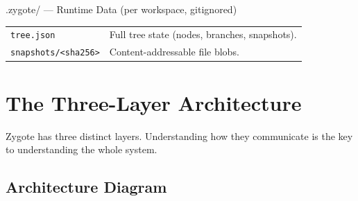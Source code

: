 \documentclass[12pt, a4paper]{article}
\begin{document}
\begin{filebox}{.zygote/ --- Runtime Data (per workspace, gitignored)}
\begin{tabular}{@{}p{6.5cm}p{7.5cm}@{}}
\texttt{tree.json} & Full tree state (nodes, branches, snapshots). \\
\texttt{snapshots/<sha256>} & Content-addressable file blobs. \\
\end{tabular}
\end{filebox}

\newpage

\section{The Three-Layer Architecture}

Zygote has three distinct layers. Understanding how they communicate is the key to understanding the whole system.

\subsection{Architecture Diagram}
\end{document}
